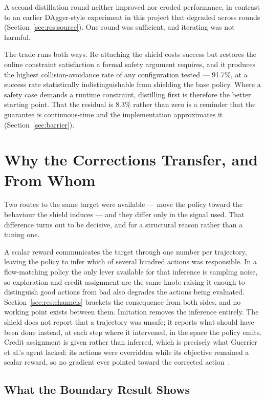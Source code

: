 \documentclass[a4paper,11pt]{report}
\begin{document}
A second distillation round neither improved nor eroded performance, in contrast to an earlier
DAgger-style experiment in this project that degraded across rounds
(Section~\ref{sec:res:source}). One round was sufficient, and iterating was not harmful.

The trade runs both ways. Re-attaching the shield costs success but restores the online constraint
satisfaction a formal safety argument requires, and it produces the highest collision-avoidance
rate of any configuration tested --- 91.7\%, at a success rate statistically indistinguishable
from shielding the base policy. Where a safety case demands a runtime constraint, distilling first
is therefore the better starting point. That the residual is 8.3\% rather than zero is a reminder
that the guarantee is continuous-time and the implementation approximates it
(Section~\ref{sec:barrier}).

\section{Why the Corrections Transfer, and From Whom}\label{sec:disc:transfer}

Two routes to the same target were available --- move the policy toward the behaviour the shield
induces --- and they differ only in the signal used. That difference turns out to be decisive, and
for a structural reason rather than a tuning one.

A scalar reward communicates the target through one number per trajectory, leaving the policy to
infer which of several hundred actions was responsible. In a flow-matching policy the only lever
available for that inference is sampling noise, so exploration and credit assignment are the same
knob: raising it enough to distinguish good actions from bad also degrades the actions being
evaluated. Section~\ref{sec:res:channels} brackets the consequence from both sides, and no working
point exists between them. Imitation removes the inference entirely. The shield does not report
that a trajectory was unsafe; it reports what should have been done instead, at each step where it
intervened, in the space the policy emits. Credit assignment is given rather than inferred, which
is precisely what Guerrier et al.'s agent lacked: its actions were overridden while its objective
remained a scalar reward, so no gradient ever pointed toward the corrected
action~\cite{guerrier2025guardrails}.

\subsection*{What the Boundary Result Shows}
\end{document}

